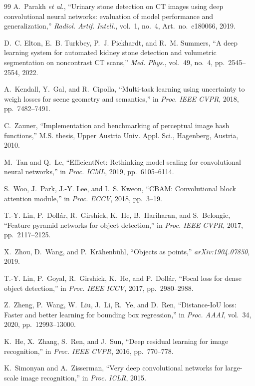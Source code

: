 \documentclass[conference]{IEEEtran}
\begin{document}
\begin{thebibliography}{99}
A.~Parakh \emph{et al.}, ``Urinary stone detection on CT images using deep convolutional neural networks:
evaluation of model performance and generalization,'' \emph{Radiol. Artif. Intell.}, vol.~1, no.~4,
Art.~no.~e180066, 2019.

D.~C. Elton, E.~B. Turkbey, P.~J. Pickhardt, and R.~M. Summers, ``A deep learning system for automated kidney
stone detection and volumetric segmentation on noncontrast CT scans,'' \emph{Med. Phys.}, vol.~49, no.~4,
pp.~2545--2554, 2022.

A.~Kendall, Y.~Gal, and R.~Cipolla, ``Multi-task learning using uncertainty to weigh losses for scene geometry
and semantics,'' in \emph{Proc. IEEE CVPR}, 2018, pp.~7482--7491.

C.~Zauner, ``Implementation and benchmarking of perceptual image hash functions,'' M.S. thesis, Upper Austria
Univ. Appl. Sci., Hagenberg, Austria, 2010.

M.~Tan and Q.~Le, ``EfficientNet: Rethinking model scaling for convolutional neural networks,'' in
\emph{Proc. ICML}, 2019, pp.~6105--6114.

S.~Woo, J.~Park, J.-Y. Lee, and I.~S. Kweon, ``CBAM: Convolutional block attention module,'' in
\emph{Proc. ECCV}, 2018, pp.~3--19.

T.-Y. Lin, P.~Doll\'ar, R.~Girshick, K.~He, B.~Hariharan, and S.~Belongie, ``Feature pyramid networks for
object detection,'' in \emph{Proc. IEEE CVPR}, 2017, pp.~2117--2125.

X.~Zhou, D.~Wang, and P.~Kr\"ahenb\"uhl, ``Objects as points,'' \emph{arXiv:1904.07850}, 2019.

T.-Y. Lin, P.~Goyal, R.~Girshick, K.~He, and P.~Doll\'ar, ``Focal loss for dense object detection,'' in
\emph{Proc. IEEE ICCV}, 2017, pp.~2980--2988.

Z.~Zheng, P.~Wang, W.~Liu, J.~Li, R.~Ye, and D.~Ren, ``Distance-IoU loss: Faster and better learning for
bounding box regression,'' in \emph{Proc. AAAI}, vol.~34, 2020, pp.~12993--13000.

K.~He, X.~Zhang, S.~Ren, and J.~Sun, ``Deep residual learning for image recognition,'' in \emph{Proc. IEEE CVPR},
2016, pp.~770--778.

K.~Simonyan and A.~Zisserman, ``Very deep convolutional networks for large-scale image recognition,'' in
\emph{Proc. ICLR}, 2015.


\end{thebibliography}
\end{document}
